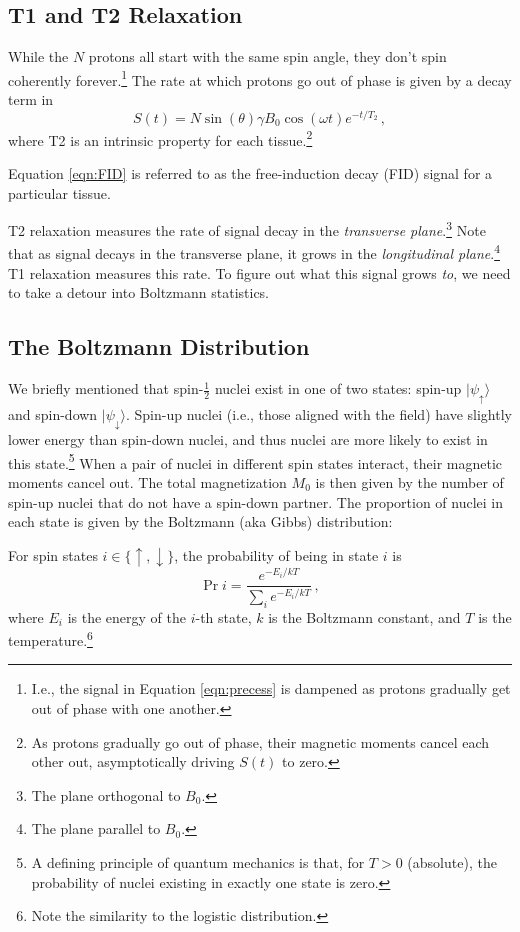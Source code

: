 \subsection{T1 and T2 Relaxation}
\label{sec:t1t2}

While the $N$ protons all start with the same spin angle, they don't spin coherently forever.\footnote{I.e., the signal in Equation \ref{eqn:precess} is dampened as protons gradually get out of phase with one another.}
The rate at which protons go out of phase is given by a decay term in
\begin{equation}
    \label{eqn:FID}
    S(t) = N \sin{(\theta)} \gamma B_0\cos(\omega t) e^{-t / T_2} \,,
\end{equation}
where T2 is an intrinsic property for each tissue.\footnote{As protons gradually go out of phase, their magnetic moments cancel each other out, asymptotically driving $S(t)$ to zero.}
\begin{defn}
Equation \ref{eqn:FID} is referred to as the free-induction decay (FID) signal for a particular tissue.
\end{defn}

T2 relaxation measures the rate of signal decay in the \textit{transverse plane}.\footnote{The plane orthogonal to $B_0$.}
Note that as signal decays in the transverse plane, it grows in the \textit{longitudinal plane}.\footnote{The plane parallel to $B_0$.}
T1 relaxation measures this rate.
To figure out what this signal grows \textit{to}, we need to take a detour into Boltzmann statistics.

\subsection{The Boltzmann Distribution}
\label{sec:boltzmann}

We briefly mentioned that spin-$\frac{1}{2}$ nuclei exist in one of two states: spin-up $| \psi_{\uparrow} \rangle$ and spin-down $| \psi_{\downarrow} \rangle$.
Spin-up nuclei (i.e., those aligned with the field) have slightly lower energy than spin-down nuclei, and thus nuclei are more likely to exist in this state.\footnote{A defining principle of quantum mechanics is that, for $T > 0$ (absolute), the probability of nuclei existing in exactly one state is zero.}
When a pair of nuclei in different spin states interact, their magnetic moments cancel out.
The total magnetization $M_0$ is then given by the number of spin-up nuclei that do not have a spin-down partner.
The proportion of nuclei in each state is given by the Boltzmann (aka Gibbs) distribution:
\begin{defn}
For spin states $i \in \{ \uparrow, \downarrow \}$, the probability of being in state $i$ is
\begin{equation}
    \Pr{i} = \frac{e^{- E_i / kT}}{\sum_i e^{- E_i / kT}} \,,
\end{equation}
where $E_i$ is the energy of the $i$-th state, $k$ is the Boltzmann constant, and $T$ is the temperature.\footnote{Note the similarity to the logistic distribution.}
\end{defn}

